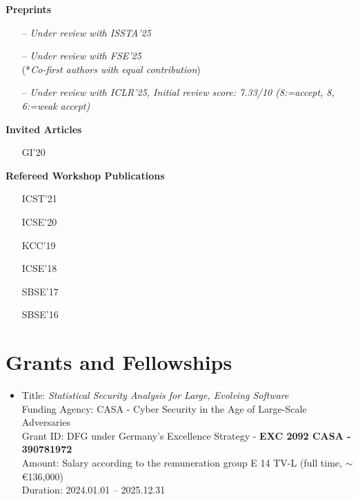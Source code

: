 \documentclass[letterpaper,11pt]{article}
\begin{document}

\textbf{Preprints}\vspace{-4pt}
\begin{itemize}[leftmargin=2cm]
  \item[]  -- \emph{Under review with ISSTA'25}
  \item[]  -- \emph{Under review with FSE'25} \\ (*\emph{Co-first authors with equal contribution})
  \item[]  -- \emph{Under review with ICLR'25, Initial review score: 7.33/10 (8:=accept, 8, 6:=weak accept)}
\end{itemize}

\textbf{Invited Articles}\vspace{-4pt}
\begin{itemize}[leftmargin=2cm]
  \item[GI'20] 
\end{itemize}

\textbf{Refereed Workshop Publications}\vspace{-4pt}
\begin{itemize}[leftmargin=2cm]
  \item[ICST'21] 
  \item[ICSE'20] 
  \item[KCC'19] 
  \item[ICSE'18] 
  \item[SBSE'17] 
  \item[SBSE'16] 
\end{itemize}

\section{Grants and Fellowships}
\begin{itemize}
  \item Title: \emph{Statistical Security Analysis for Large, Evolving Software} \\
        Funding Agency: CASA - Cyber Security in the Age of Large-Scale Adversaries \\
        Grant ID: DFG under Germany's Excellence Strategy - \textbf{EXC 2092 CASA - 390781972} \\
        Amount: Salary according to the remuneration group E 14 TV-L (full time, $\sim$ \euro{136,000}) \\
        Duration: 2024.01.01 -- 2025.12.31
\end{itemize}
\end{document}
